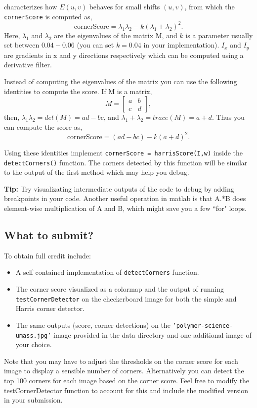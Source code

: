 \documentclass[10pt,letterpaper]{article}
\newcommand{\cmd}[1] {{\color{blue}\texttt{#1}}}
\begin{document}
characterizes how $E(u,v)$ behaves for small shifts $(u,v)$, from which the \cmd{cornerScore} is computed as,
\[
	\text{cornerScore} = \lambda_1\lambda_2 - k(\lambda_1 + \lambda_2)^2.
\]
Here, $\lambda_1$ and $\lambda_2$ are the eigenvalues of the matrix M, and $k$ is a parameter usually set between $0.04 - 0.06$ (you can set $k=0.04$ in your implementation). $I_x$ and $I_y$ are gradients in x and y directions respectively which can be computed using a derivative filter.

Instead of computing the eigenvalues of the matrix you can use the following identities to compute the score. If M is a matrix, 
\[
	M = \left[ 
	\begin{array}{cc}
				a &  b \\
				c &  d \end{array} 
				\right], 
\]
then, $\lambda_1 \lambda_2 = det(M) = ad - bc$, and $\lambda_1 + \lambda_2 = trace(M) = a + d$. Thus you can compute the score as,
\[
	\text{cornerScore} = (ad - bc) - k(a+d)^2.
\]

Using these identities implement \cmd{cornerScore = harrisScore(I,w)}
inside the \cmd{detectCorners()} function. The corners detected by
this function will be similar to the output of the first
method which may help you debug.


\textbf{Tip:} Try visualizating intermediate outputs of the code to
debug by adding breakpoints in your code. Another useful operation in
matlab is that A.*B does element-wise multiplication of A and B, which
might save you a few ``for" loops.

\subsection{What to submit?}
To obtain full credit include:
\begin{itemize}
\item A self contained implementation of \cmd{detectCorners} function.
\item The corner score visualized as a colormap and the output of running
  \cmd{testCornerDetector} on the checkerboard image for both the
  simple and Harris corner detector.
\item The same outputs (score, corner detections) on the
  \cmd{’polymer-science-umass.jpg’} image
  provided in the data directory and one additional image of your
  choice.
\end{itemize}
Note that you may have to adjust the thresholds on the corner score
for each image to display a sensible number of corners. Alternatively
you can detect the top 100 corners for each image based on the corner
score. Feel free to modify the testCornerDetector function to account
for this and include the modified version in your submission.
\end{document}
